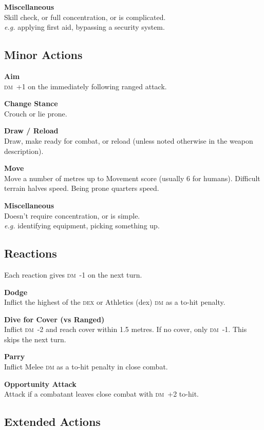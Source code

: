 \documentclass[10pt]{article}
\newcommand{\diemod}[1]{\textsc{dm}~#1}
\begin{document}
\begin{multicols}{3}
\textbf{Miscellaneous}\\
Skill check, or full concentration, or is complicated.\\
\textit{e.g.} applying first aid, bypassing a security system.

\subsection{Minor Actions}

\textbf{Aim}\\
\diemod{+1} on the immediately following ranged attack.

\textbf{Change Stance}\\
Crouch or lie prone.

\textbf{Draw / Reload}\\
Draw, make ready for combat, or reload (unless noted otherwise in the
weapon description).

\textbf{Move}\\
Move a number of metres up to Movement score (usually 6 for humans).
Difficult terrain halves speed.  Being prone quarters speed.

\textbf{Miscellaneous}\\
Doesn't require concentration, or is simple.\\
\textit{e.g.} identifying equipment, picking something up.

\subsection{Reactions}

Each reaction gives \diemod{-1} on the next turn.

\textbf{Dodge}\\
Inflict the highest of the \textsc{dex} or Athletics (dex) \textsc{dm}
as a to-hit penalty.

\textbf{Dive for Cover (vs Ranged)}\\
Inflict \diemod{-2} and reach cover within 1.5 metres.  If no cover,
only \diemod{-1}.  This skips the next turn.

\textbf{Parry}\\
Inflict Melee \textsc{dm} as a to-hit penalty in close combat.

\textbf{Opportunity Attack}\\
Attack if a combatant leaves close combat with \diemod{+2} to-hit.

\subsection{Extended Actions}


\end{multicols}
\end{document}
